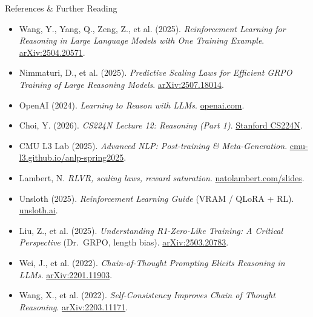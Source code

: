 \begin{frame}[allowframebreaks]{References \& Further Reading}
\begin{itemize}
    \item Wang, Y., Yang, Q., Zeng, Z., et al. (2025). \emph{Reinforcement Learning for Reasoning in Large Language Models with One Training Example}. \href{https://arxiv.org/abs/2504.20571}{arXiv:2504.20571}.
    \item Nimmaturi, D., et al. (2025). \emph{Predictive Scaling Laws for Efficient GRPO Training of Large Reasoning Models}. \href{https://arxiv.org/abs/2507.18014}{arXiv:2507.18014}.
    \item OpenAI (2024). \emph{Learning to Reason with LLMs}. \href{https://openai.com/index/learning-to-reason-with-llms/}{openai.com}.
    \item Choi, Y. (2026). \emph{CS224N Lecture 12: Reasoning (Part 1)}. \href{https://web.stanford.edu/class/cs224n/slides_w26/cs224n-2026-lecture12-reasoning-part1.pdf}{Stanford CS224N}.
    \item CMU L3 Lab (2025). \emph{Advanced NLP: Post-training \& Meta-Generation}. \href{https://cmu-l3.github.io/anlp-spring2025/}{cmu-l3.github.io/anlp-spring2025}.
    \item Lambert, N. \emph{RLVR, scaling laws, reward saturation}. \href{https://natolambert.com/slides}{natolambert.com/slides}.
    \item Unsloth (2025). \emph{Reinforcement Learning Guide} (VRAM / QLoRA + RL). \href{https://unsloth.ai/docs/get-started/reinforcement-learning-rl-guide}{unsloth.ai}.
    \item Liu, Z., et al. (2025). \emph{Understanding R1-Zero-Like Training: A Critical Perspective} (Dr.\ GRPO, length bias). \href{https://arxiv.org/abs/2503.20783}{arXiv:2503.20783}.
    \item Wei, J., et al. (2022). \emph{Chain-of-Thought Prompting Elicits Reasoning in LLMs}. \href{https://arxiv.org/abs/2201.11903}{arXiv:2201.11903}.
    \item Wang, X., et al. (2022). \emph{Self-Consistency Improves Chain of Thought Reasoning}. \href{https://arxiv.org/abs/2203.11171}{arXiv:2203.11171}.
  \end{itemize}
\end{frame}
